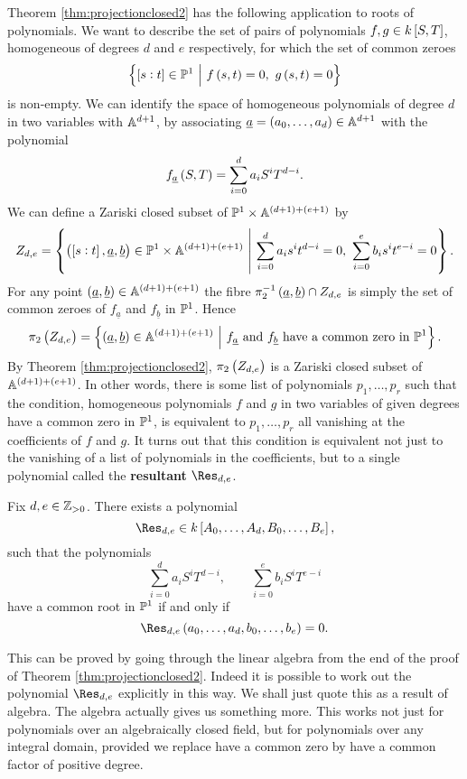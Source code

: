 Theorem \ref{thm:projectionclosed2} has the following application to roots of polynomials. We want to describe the set of pairs of polynomials $ f, g \in k\sbr{S, T} $, homogeneous of degrees $ d $ and $ e $ respectively, for which the set of common zeroes
$$ \cbr{\sbr{s : t} \in \PP^1 \st f\br{s, t} = 0, \ g\br{s, t} = 0} $$
is non-empty. We can identify the space of homogeneous polynomials of degree $ d $ in two variables with $ \AA^{d + 1} $, by associating $ \underline{a} = \br{a_0, \dots, a_d} \in \AA^{d + 1} $ with the polynomial
$$ f_{\underline{a}}\br{S, T} = \sum_{i = 0}^d a_iS^iT^{d - i}. $$
We can define a Zariski closed subset of $ \PP^1 \times \AA^{\br{d + 1} + \br{e + 1}} $ by
$$ Z_{d, e} = \cbr{\br{\sbr{s : t}, \underline{a}, \underline{b}} \in \PP^1 \times \AA^{\br{d + 1} + \br{e + 1}} \st \sum_{i = 0}^d a_is^it^{d - i} = 0, \ \sum_{i = 0}^e b_is^it^{e - i} = 0}. $$
For any point $ \br{\underline{a}, \underline{b}} \in \AA^{\br{d + 1} + \br{e + 1}} $ the fibre $ \pi_2^{-1}\br{\underline{a}, \underline{b}} \cap Z_{d, e} $ is simply the set of common zeroes of $ f_{\underline{a}} $ and $ f_{\underline{b}} $ in $ \PP^1 $. Hence
$$ \pi_2\br{Z_{d, e}} = \cbr{\br{\underline{a}, \underline{b}} \in \AA^{\br{d + 1} + \br{e + 1}} \st f_{\underline{a}} \ \text{and} \ f_{\underline{b}} \ \text{have a common zero in} \ \PP^1}. $$
By Theorem \ref{thm:projectionclosed2}, $ \pi_2\br{Z_{d, e}} $ is a Zariski closed subset of $ \AA^{\br{d + 1} + \br{e + 1}} $. In other words, there is some list of polynomials $ p_1, \dots, p_r $ such that the condition, homogeneous polynomials $ f $ and $ g $ in two variables of given degrees have a common zero in $ \PP^1 $, is equivalent to $ p_1, \dots, p_r $ all vanishing at the coefficients of $ f $ and $ g $. It turns out that this condition is equivalent not just to the vanishing of a list of polynomials in the coefficients, but to a single polynomial called the \textbf{resultant} $ \Res_{d, e} $.

\pagebreak

\begin{theorem}
\label{thm:fieldresultant}
Fix $ d, e \in \ZZ_{> 0} $. There exists a polynomial
$$ \Res_{d, e} \in k\sbr{A_0, \dots, A_d, B_0, \dots, B_e}, $$
such that the polynomials
$$ \sum_{i = 0}^d a_iS^iT^{d - i}, \qquad \sum_{i = 0}^e b_iS^iT^{e - i} $$
have a common root in $ \PP^1 $ if and only if
$$ \Res_{d, e}\br{a_0, \dots, a_d, b_0, \dots, b_e} = 0. $$
\end{theorem}

This can be proved by going through the linear algebra from the end of the proof of Theorem \ref{thm:projectionclosed2}. Indeed it is possible to work out the polynomial $ \Res_{d, e} $ explicitly in this way. We shall just quote this as a result of algebra. The algebra actually gives us something more. This works not just for polynomials over an algebraically closed field, but for polynomials over any integral domain, provided we replace have a common zero by have a common factor of positive degree.

